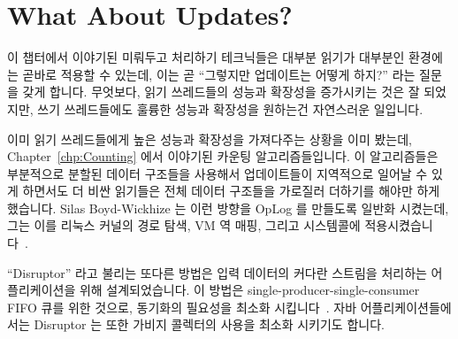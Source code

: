 
\section{What About Updates?}
\label{sec:defer:What About Updates?}

이 챕터에서 이야기된 미뤄두고 처리하기 테크닉들은 대부분 읽기가 대부분인
환경에는 곧바로 적용할 수 있는데, 이는 곧 ``그렇지만 업데이트는 어떻게 하지?''
라는 질문을 갖게 합니다.
무엇보다, 읽기 쓰레드들의 성능과 확장성을 증가시키는 것은 잘 되었지만, 쓰기
쓰레드들에도 훌륭한 성능과 확장성을 원하는건 자연스러운 일입니다.
\iffalse

The deferred-processing techniques called out in this chapter are most
directly applicable to read-mostly situations, which begs the question
``But what about updates?''
After all, increasing the performance and scalability of readers is all
well and good, but it is only natural to also want great performance and
scalability for writers.
\fi

이미 읽기 쓰레드들에게 높은 성능과 확장성을 가져다주는 상황을 이미 봤는데,
Chapter~\ref{chp:Counting} 에서 이야기된 카운팅 알고리즘들입니다.
이 알고리즘들은 부분적으로 분할된 데이터 구조들을 사용해서 업데이트들이
지역적으로 일어날 수 있게 하면서도 더 비싼 읽기들은 전체 데이터 구조들을
가로질러 더하기를 해야만 하게 했습니다.
Silas Boyd-Wickhize 는 이런 방향을 OpLog 를 만들도록 일반화 시켰는데, 그는 이를
리눅스 커널의 경로 탐색, VM 역 매핑, 그리고  시스템콜에
적용시켰습니다~\cite{SilasBoydWickizerPhD}.
\iffalse

We have already seen one situation featuring high performance and
scalability for writers, namely the counting algorithms surveyed in
Chapter~\ref{chp:Counting}.
These algorithms featured partially partitioned data structures so
that updates can can operate locally, while the more-expensive reads
must sum across the entire data structure.
Silas Boyd-Wickhizer has generalized this notion to produce
OpLog, which he has applied to
Linux-kernel pathname lookup, VM reverse mappings, and the \co{stat()} system
call~\cite{SilasBoydWickizerPhD}.
\fi

``Disruptor'' 라고 불리는 또다른 방법은 입력 데이터의 커다란 스트림을 처리하는
어플리케이션을 위해 설계되었습니다.
이 방법은 single-producer-single-consumer FIFO 큐를 위한 것으로, 동기화의
필요성을 최소화 시킵니다~\cite{AdrianSutton2013LCA:Disruptor}.
자바 어플리케이션들에서는 Disruptor 는 또한 가비지 콜렉터의 사용을 최소화
시키기도 합니다.

